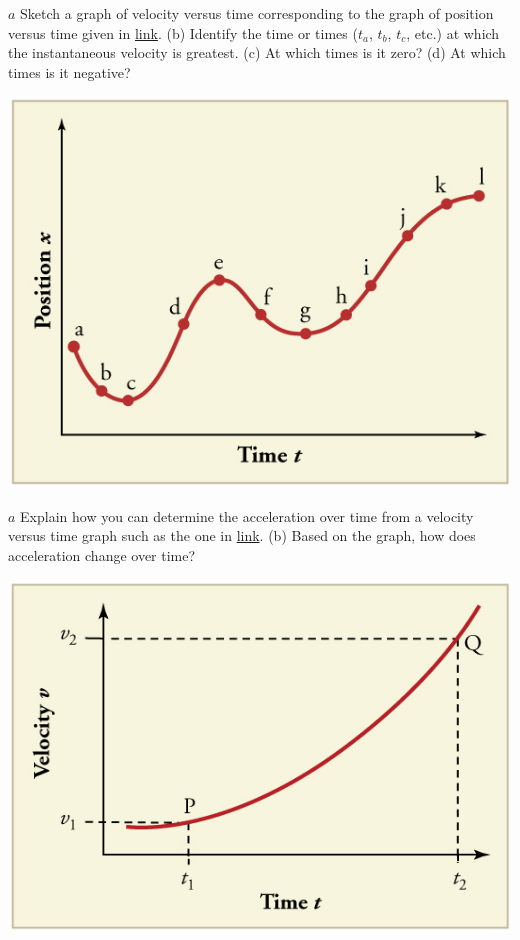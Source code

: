 \documentclass[
]{book}
\begin{document}
\hypertarget{fs-id4168594}{}
\leavevmode{}%
\(a\) Sketch a graph of velocity versus time corresponding to the graph
of position versus time given in
\protect\hyperlink{import-auto-id2562897}{link}. (b) Identify the
time or times (\(t_{a}\), \(t_{b}\), \(t_{c}\), etc.) at which the
instantaneous velocity is greatest. (c) At which times is it zero? (d)
At which times is it negative?

\includegraphics{images/Figure_03_08Sol_02.jpg}

\hypertarget{fs-id1549493}{}
\leavevmode{}%
\(a\) Explain how you can determine the acceleration over time from a
velocity versus time graph such as the one in
\protect\hyperlink{import-auto-id1778975}{link}. (b) Based on the
graph, how does acceleration change over time?

\includegraphics{images/Figure_03_08Sol_04.jpg}
\end{document}
